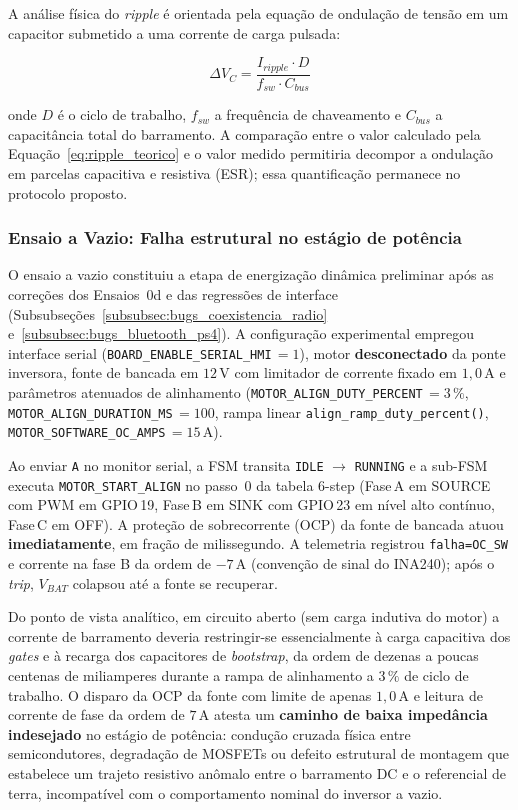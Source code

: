 A análise física do \textit{ripple} é orientada pela equação de ondulação de tensão em um capacitor submetido a uma corrente de carga pulsada:

\begin{equation}
    \Delta V_{C} = \frac{I_{ripple} \cdot D}{f_{sw} \cdot C_{bus}}
    \label{eq:ripple_teorico}
\end{equation}

\noindent onde $D$ é o ciclo de trabalho, $f_{sw}$ a frequência de chaveamento e $C_{bus}$ a capacitância total do barramento. A comparação entre o valor calculado pela Equação~\ref{eq:ripple_teorico} e o valor medido permitiria decompor a ondulação em parcelas capacitiva e resistiva (ESR); essa quantificação permanece no protocolo proposto.

\subsubsection{Ensaio a Vazio: Falha estrutural no estágio de potência}
\label{subsubsec:ensaio_vazio_falha}

O ensaio a vazio constituiu a etapa de energização dinâmica preliminar após as correções dos Ensaios~0d e das regressões de interface (Subsubseções~\ref{subsubsec:bugs_coexistencia_radio} e~\ref{subsubsec:bugs_bluetooth_ps4}). A configuração experimental empregou interface serial (\texttt{BOARD\_ENABLE\_SERIAL\_HMI}\,$= 1$), motor \textbf{desconectado} da ponte inversora, fonte de bancada em $12\,\text{V}$ com limitador de corrente fixado em \textbf{$1{,}0\,\text{A}$} e parâmetros atenuados de alinhamento (\texttt{MOTOR\_ALIGN\_DUTY\_PERCENT}\,$= 3\,\%$, \texttt{MOTOR\_ALIGN\_DURATION\_MS}\,$= 100$, rampa linear \texttt{align\_ramp\_duty\_percent()}, \texttt{MOTOR\_SOFTWARE\_OC\_AMPS}\,$= 15\,\text{A}$).

Ao enviar \texttt{A} no monitor serial, a FSM transita \texttt{IDLE} $\to$ \texttt{RUNNING} e a sub-FSM executa \texttt{MOTOR\_START\_ALIGN} no passo~0 da tabela 6-step (Fase\,A em SOURCE com PWM em GPIO\,19, Fase\,B em SINK com GPIO\,23 em nível alto contínuo, Fase\,C em OFF). A proteção de sobrecorrente (OCP) da fonte de bancada atuou \textbf{imediatamente}, em fração de milissegundo. A telemetria registrou \texttt{falha=OC\_SW} e corrente na fase B da ordem de $-7\,\text{A}$ (convenção de sinal do INA240); após o \textit{trip}, $V_{BAT}$ colapsou até a fonte se recuperar.

Do ponto de vista analítico, em circuito aberto (sem carga indutiva do motor) a corrente de barramento deveria restringir-se essencialmente à carga capacitiva dos \textit{gates} e à recarga dos capacitores de \textit{bootstrap}, da ordem de dezenas a poucas centenas de miliamperes durante a rampa de alinhamento a $3\,\%$ de ciclo de trabalho. O disparo da OCP da fonte com limite de apenas $1{,}0\,\text{A}$ e leitura de corrente de fase da ordem de $7\,\text{A}$ atesta um \textbf{caminho de baixa impedância indesejado} no estágio de potência: condução cruzada física entre semicondutores, degradação de MOSFETs ou defeito estrutural de montagem que estabelece um trajeto resistivo anômalo entre o barramento DC e o referencial de terra, incompatível com o comportamento nominal do inversor a vazio.

